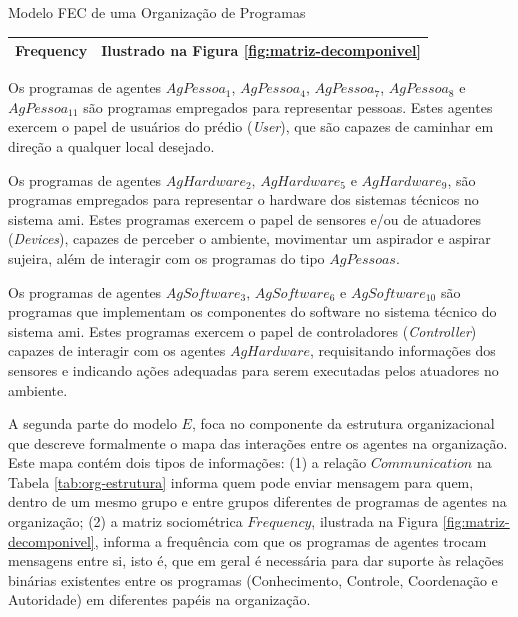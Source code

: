 \begin{section}{Modelo FEC de uma Organização de Programas}
\begin{table}[h!]
{\begin{tabular}{| p{5cm} | p{10cm}|}
            \textbf{Frequency} & Ilustrado na Figura \ref{fig:matriz-decomponivel} \newline \\

            \hline
            \end{tabular}
        }{
    }
    \end{table}
    
    
    Os programas de agentes $AgPessoa_1$, $AgPessoa_4$, $AgPessoa_7$, $AgPessoa_8$ e $AgPessoa_{11}$ são programas empregados para representar pessoas. Estes agentes exercem o papel de usuários do prédio (\textit{User}), que são capazes de caminhar em direção a qualquer local desejado. 
    
    Os programas de agentes $AgHardware_2$, $AgHardware_5$ e $AgHardware_9$, são programas empregados para representar o hardware dos sistemas técnicos no sistema \acrshort{ami}. Estes programas exercem o papel de sensores e/ou de atuadores (\textit{Devices}), capazes de perceber o ambiente, movimentar um aspirador e aspirar sujeira, além de interagir com os programas do tipo $AgPessoas$.
    
    Os programas de agentes $AgSoftware_3$, $AgSoftware_6$ e $AgSoftware_{10}$ são programas que implementam os componentes do software no sistema técnico do sistema \acrshort{ami}. Estes programas exercem o papel de controladores (\textit{Controller}) capazes de interagir com os agentes $AgHardware$, requisitando informações dos sensores e indicando ações adequadas para serem executadas pelos atuadores no ambiente.
    
    A segunda parte do modelo $E$, foca no componente da estrutura organizacional que descreve formalmente o mapa das interações entre os agentes na organização. Este mapa contém dois tipos de informações: (1) a relação $Communication$ na Tabela \ref{tab:org-estrutura} informa quem pode enviar mensagem para quem, dentro de um mesmo grupo e entre grupos diferentes de programas de agentes na organização; (2) a matriz sociométrica $Frequency$, ilustrada na Figura \ref{fig:matriz-decomponivel}, informa a frequência com que os programas de agentes trocam mensagens entre si, isto é, que em geral é necessária para dar suporte às relações binárias existentes entre os programas (Conhecimento, Controle, Coordenação e Autoridade) em diferentes papéis na organização. 
        

\end{section}
